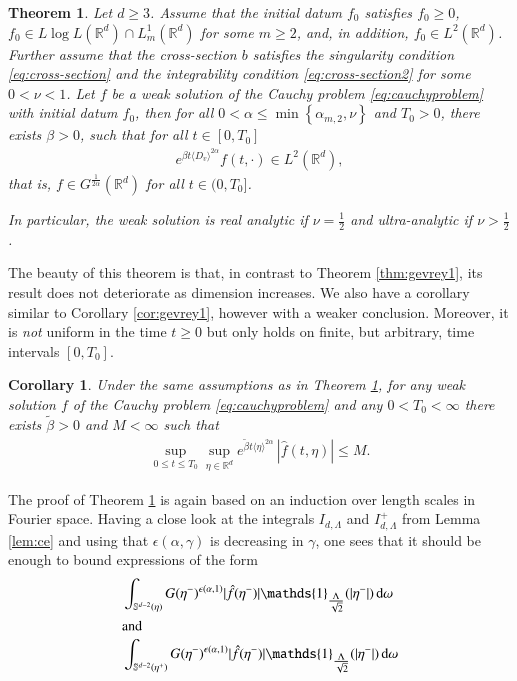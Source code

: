 \documentclass[11pt,a4paper,reqno]{amsart}
\theoremstyle{plain}
\newtheorem{corollary}[proposition]{Corollary}
\newtheorem{theorem}[proposition]{Theorem}
\theoremstyle{definition}
\begin{document}
\begin{theorem}\label{thm:gevrey2} Let $d\ge 3$.
	Assume that the initial datum $f_0$ satisfies $f_0\geq 0$, $f_0 \in L\log L({\mathbb{R}}^d) \cap L^1_{m}({\mathbb{R}}^d)$ for some $m\geq 2$, and, in addition, $f_0\in L^2({\mathbb{R}}^d)$.
	Further assume that the cross-section $b$ satisfies the \emph{singularity condition} \eqref{eq:cross-section} and the \emph{integrability condition} \eqref{eq:cross-section2} for some $0<\nu<1$. Let $f$ be a weak solution of the Cauchy problem \eqref{eq:cauchyproblem} with initial datum $f_0$, 	
	then for all $0<\alpha\leq \min\left\{\alpha_{m,2}, \nu\right\}$ and $T_0>0$, there exists $\beta>0$, such that for all $t\in[0, T_0]$
 	\begin{align}\label{eq:local-time-uniform-2}
		e^{\beta t \langle D_v\rangle^{2\alpha}} f(t,\cdot) \in L^2({\mathbb{R}}^d),
	\end{align}
	that is, $f\in G^{\tfrac{1}{2\alpha}}({\mathbb{R}}^d)$ for all $t\in(0,T_0]$.

	In particular, the weak solution is real analytic if $\nu=\frac{1}{2}$ and ultra-analytic if $\nu>\frac{1}{2}$.
\end{theorem}
The beauty of this theorem is that, in contrast to Theorem \ref{thm:gevrey1}, its result does not deteriorate as dimension increases. We also have a corollary similar to Corollary \ref{cor:gevrey1}, however with a weaker conclusion. Moreover, it is \emph{not} uniform in the time $t\ge 0$ but only holds on finite, but arbitrary, time intervals $[0,T_0]$.
\begin{corollary}\label{cor:gevrey2}
	Under the same assumptions as in Theorem \ref{thm:gevrey2}, for any weak solution
	$f$ of the Cauchy problem \eqref{eq:cauchyproblem} and any $0<T_0<\infty$ there exists $\widetilde{\beta}>0$ and $M<\infty$ such that
	\begin{align}\label{eq:cor-gevrey2}
		\sup_{0\le t\le T_0}\sup_{\eta\in{\mathbb{R}}^d} e^{ \widetilde{\beta} t \langle \eta \rangle^{2\alpha}} \, |\hat{f}(t,\eta)| \le M .
	\end{align}
\end{corollary}
The proof of Theorem \ref{thm:gevrey2} is again based on an induction over length scales in Fourier space. Having a close look at the integrals $I_{d,\Lambda}$ and $I_{d,\Lambda}^+$ from Lemma \ref{lem:ce} and using that $\epsilon(\alpha,\gamma)$ is decreasing in $\gamma $, one sees that it should be enough to bound expressions of the form
\begin{align*}
	& \int_{{\mathbb{S}}^{d-2}(\eta)} G(\eta^-)^{\epsilon(\alpha,1)} |\hat{f}(\eta^-)|
		{\mathds{1}}_{\tfrac{\Lambda}{\sqrt{2}}}(|\eta^-|)\, \mathrm{d}\omega \\
	\intertext{and}
	& \int_{{\mathbb{S}}^{d-2}(\eta^+)} G(\eta^-)^{\epsilon(\alpha,1)} |\hat{f}(\eta^-)|
		{\mathds{1}}_{\tfrac{\Lambda}{\sqrt{2}}}(|\eta^-|)\, \mathrm{d}\omega
\end{align*}
\end{document}
